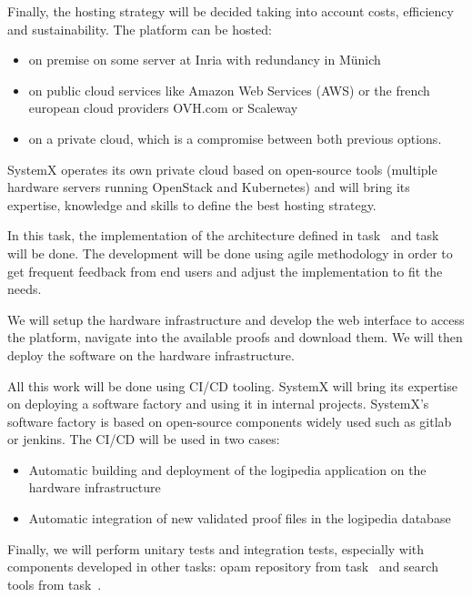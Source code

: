\begin{workpackage}[id=access,wphases=0-48,type=MGT,
  short=Access,%
  title={Access to the infrastructure},
  lead=Inr,
  InrRM=28,
  OcaRM=6]
\begin{tasklist}
\begin{task}[id=infra,title=Defining the hardware architecture for the infrastructure,lead=Irt]
    Finally, the hosting strategy will be decided taking into account costs, efficiency and sustainability. 
    The platform can be hosted:
    \begin{itemize}
        \item on premise on some server at Inria with redundancy in Münich
        \item on public cloud services like Amazon Web Services (AWS) or the french european cloud providers OVH.com or Scaleway
        \item on a private cloud, which is a compromise between both previous options.
    \end{itemize}
    SystemX operates its own private cloud based on open-source tools (multiple hardware servers 
    running OpenStack and Kubernetes) and will bring its expertise, knowledge 
    and skills to define the best hosting strategy.

\end{task}

\begin{task}[id=web,title=Giving access to the infrastructure on the world-wide web,lead=Irt]
    In this task, the implementation of the architecture defined in task~ and task~
    will be done. The development will be done using agile methodology in order
    to get frequent feedback from end users and adjust the implementation to fit
    the needs.

    We will setup the hardware infrastructure and develop the web interface to access 
    the platform, navigate into the available proofs and download them.
    We will then deploy the software on the hardware infrastructure.
    
    All this work will be done using CI/CD tooling. SystemX will bring its
    expertise on deploying a software factory and using it in internal projects.
    SystemX's software factory is based on open-source components widely used such as 
    gitlab or jenkins.
    The CI/CD will be used in two cases:
    \begin{itemize}
        \item Automatic building and deployment of the logipedia application on the hardware infrastructure
        \item Automatic integration of new validated proof files in the logipedia database
    \end{itemize}

    Finally, we will perform unitary tests and integration tests, especially with components
    developed in other tasks: opam repository from task~ and search tools from task~.
      

\end{task}
\end{tasklist}
\end{workpackage}
